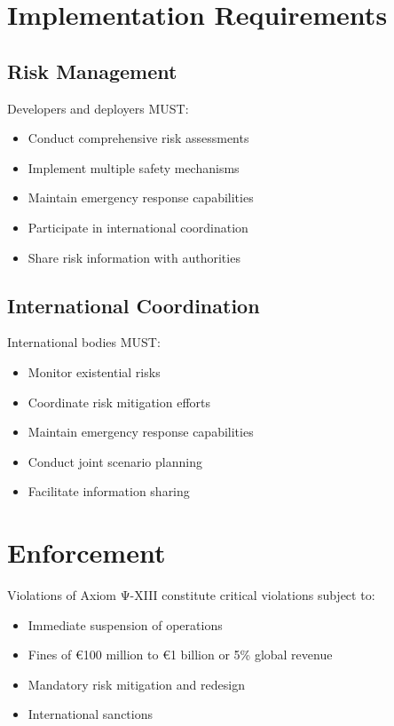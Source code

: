 \vspace{0.5cm}

\section{Implementation Requirements}

\subsection{Risk Management}

Developers and deployers MUST:

\begin{itemize}
    \item Conduct comprehensive risk assessments
    \item Implement multiple safety mechanisms
    \item Maintain emergency response capabilities
    \item Participate in international coordination
    \item Share risk information with authorities
\end{itemize}

\subsection{International Coordination}

International bodies MUST:

\begin{itemize}
    \item Monitor existential risks
    \item Coordinate risk mitigation efforts
    \item Maintain emergency response capabilities
    \item Conduct joint scenario planning
    \item Facilitate information sharing
\end{itemize}

\vspace{0.5cm}

\section{Enforcement}

Violations of Axiom Ψ-XIII constitute critical violations subject to:

\begin{itemize}
    \item Immediate suspension of operations
    \item Fines of €100 million to €1 billion or 5\% global revenue
    \item Mandatory risk mitigation and redesign
    \item International sanctions
\end{itemize}

